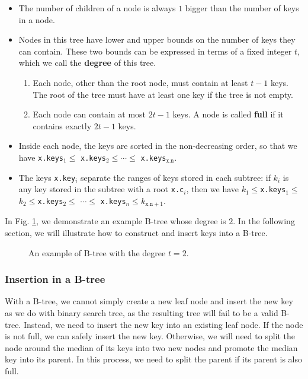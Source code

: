 \begin{itemize}
\item The number of children of a node is always $1$ bigger than the number of keys in a node.
\item Nodes in this tree have lower and upper bounds on the number of keys they can contain. These two bounds can be expressed in terms of a fixed integer $t$, which we call the \textbf{degree} of this tree.
	\begin{enumerate}
		\item Each node, other than the root node, must contain at least $t-1$ keys. The root of the tree must have at least one key if the tree is not empty.
		\item Each node can contain at most $2t-1$ keys. A node is called \textbf{full} if it contains exactly $2t-1$ keys.
	\end{enumerate}
\item Inside each node, the keys are sorted in the non-decreasing order, so that we have \texttt{x.keys$_1\leq $} \texttt{x.keys$_2\leq \cdots \leq$} \texttt{x.keys$_{\texttt{x.n}}$}.
\item The keys \texttt{x.key$_i$} separate the ranges of keys stored in each subtree: if $k_i$ is any key stored in the subtree with a root \texttt{x.c$_i$}, then we have $k_1\leq$\texttt{x.keys$_1\leq $}$ k_2\leq$\texttt{x.keys$_2\leq $} $\cdots\leq$ \texttt{x.keys$_n\leq $}$k_{\texttt{x.n}+1}$.
\end{itemize}

In Fig. \ref{fig: B-tree}, we demonstrate an example B-tree whose degree is $2$. In the following section, we will illustrate how to construct and insert keys into a B-tree.

\begin{figure}
\centering

\caption{An example of B-tree with the degree $t=2$.}
\label{fig: B-tree}
\end{figure}

\subsubsection{Insertion in a B-tree}

With a B-tree, we cannot simply create a new leaf node and insert the new key as we do with binary search tree, as the resulting tree will fail to be a valid B-tree. Instead, we need to insert the new key into an existing leaf node. If the node is not full, we can safely insert the new key. Otherwise, we will need to split the node around the median of its keys into two new nodes and promote the median key into its parent. In this process, we need to split the parent if its parent is also full.

